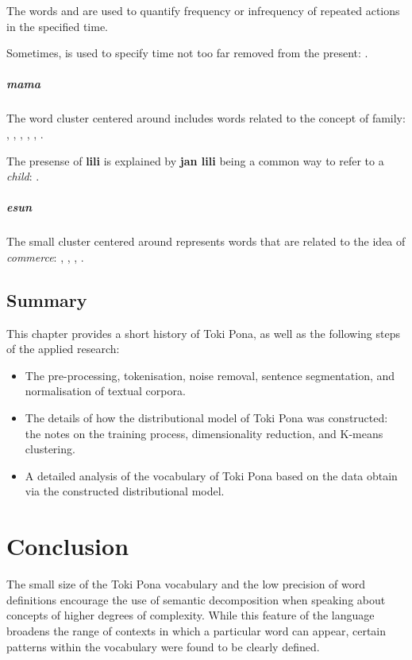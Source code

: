 \documentclass[14pt, a4paper]{extreport}
\begin{document}
The words  and  are used to quantify frequency or infrequency of repeated actions in the specified time.

Sometimes,  is used to specify time not too far removed from the present: .
      \paragraph{mama}
The word cluster centered around  includes words related to the concept of family: , , , , , .

The presense of \textbf{lili} is explained by \textbf{jan lili} being a common way to refer to a \textit{child}: .
      \paragraph{esun}
The small cluster centered around  represents words that are related to the idea of \textit{commerce}: , , , .

  \section{Summary}

This chapter provides a short history of Toki Pona, as well as the following steps of the applied research:

\begin{itemize}
  \item The pre-processing, tokenisation, noise removal, sentence segmentation, and normalisation of textual corpora.
  \item The details of how the distributional model of Toki Pona was constructed: the notes on the training process, dimensionality reduction, and K-means clustering.
  \item A detailed analysis of the vocabulary of Toki Pona based on the data obtain via the constructed distributional model.
\end{itemize}

\chapter{Conclusion}
The small size of the Toki Pona vocabulary and the low precision of word definitions encourage the use of semantic decomposition when speaking about concepts of higher degrees of complexity. While this feature of the language broadens the range of contexts in which a particular word can appear, certain patterns within the vocabulary were found to be clearly defined.
\end{document}
